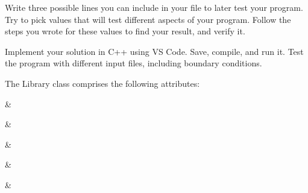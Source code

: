 {{{{{{{\vspace{8cm}

\begin{multipart}
    Write three possible lines you can include in your file to later test your program. Try to pick values that will test different aspects of your program. Follow the steps you wrote for these values to find your result, and verify it.
\end{multipart}

\vspace{5cm}

\begin{multipart}
    Implement your solution in C++ using VS Code. Save, compile, and run it. Test the program with different input files, including boundary conditions.
\end{multipart}

\vspace{5cm}














\vspace{10pt}

The Library class comprises the following attributes:

\vspace{10pt}

 & 


\begin{example}



\end{example}

 & 

\begin{example}


\end{example}

& 

\begin{example}


\end{example}



& 

\begin{example}


\end{example}


 
 & 

}}}}}}}
